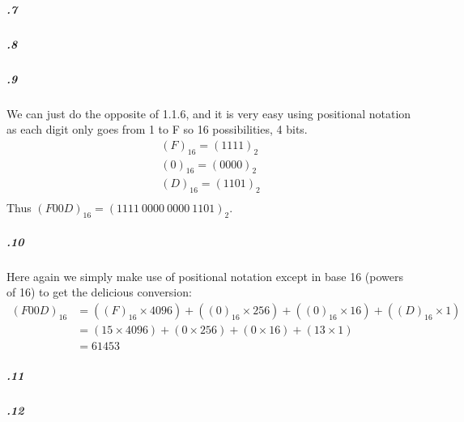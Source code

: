 \documentclass[11pt,letterpaper]{article}
\begin{document}
		\subparagraph{.7}
		
		\subparagraph{.8}
		
		\subparagraph{.9}
		We can just do the opposite of 1.1.6, and it is very easy using positional notation as each digit only goes from 1 to F so 16 possibilities, 4 bits.
		\begin{align*}
		(F)_{16} = (1111)_2\\
		(0)_{16} = (0000)_2\\
		(D)_{16} = (1101)_2\\
		\end{align*}
		Thus $(F00D)_{16} = (1111\ 0000\ 0000\ 1101)_2$.
		
		\subparagraph{.10}
		Here again we simply make use of positional notation except in base 16 (powers of 16) to get the delicious conversion:
		\begin{align*}
		(F00D)_16 &= ((F)_{16} \times 4096) + ((0)_{16} \times 256) + ((0)_{16} \times 16) + ((D)_{16} \times 1)\\
		&= (15 \times 4096) + (0 \times 256) + (0 \times 16) + (13 \times 1)\\
		&= 61 453
		\end{align*}
		
		\subparagraph{.11}
		
		\subparagraph{.12}
		
	\section{}
	
\end{document}
